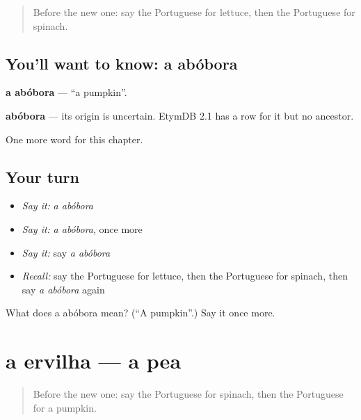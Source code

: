\label{lesson:PT-C168-abobora}



\begin{quote}
Before the new one: say the Portuguese for lettuce, then the Portuguese for spinach.
\end{quote}

\subsection*{You'll want to know: a abóbora}
\textbf{a abóbora} — \textquotedblleft{}a pumpkin\textquotedblright{}.

\begin{cousinweb}
\textbf{abóbora} — its origin is uncertain. EtymDB 2.1 has a row for it but no ancestor.
\end{cousinweb}

\begin{grammarlens}[title={What you've built}]
One more word for this chapter.
\end{grammarlens}

\subsection*{Your turn}
\begin{itemize}
\raggedright
  \item \emph{Say it:} \emph{a abóbora}
  \item \emph{Say it:} \emph{a abóbora}, once more
  \item \emph{Say it:} say \emph{a abóbora}
  \item \emph{Recall:} say the Portuguese for lettuce, then the Portuguese for spinach, then say \emph{a abóbora} again
\end{itemize}

\begin{tcolorbox}[breakable,colback=teal!4,colframe=teal!35!black,title={Before you move on}]
What does a abóbora mean? (\textquotedblleft{}A pumpkin\textquotedblright{}.) Say it once more.
\end{tcolorbox}
\section[a ervilha]{a ervilha — a pea}

\label{lesson:PT-C168-ervilha}



\begin{quote}
Before the new one: say the Portuguese for spinach, then the Portuguese for a pumpkin.
\end{quote}

